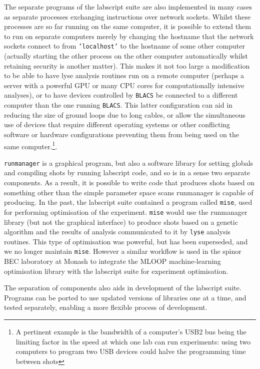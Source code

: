 The separate programs of the labscript suite are also implemented in many cases as separate processes exchanging instructions over network sockets. Whilst these processes are so far running on the same computer, it is possible to extend them to run on separate computers merely by changing the hostname that the network sockets connect to from \texttt{'localhost'} to the hostname of some other computer (actually starting the other process on the other computer automatically whilst retaining security is another matter). This makes it not too large a modification to be able to have lyse analysis routines run on a remote computer (perhaps a server with a powerful GPU or many CPU cores for computationally intensive analyses), or to have devices controlled by \texttt{BLACS} be connected to a different computer than the one running \texttt{BLACS}. This latter configuration can aid in reducing the size of ground loops due to long cables, or allow the simultaneous use of devices that require different operating systems or other conflicting software or hardware configurations preventing them from being used on the same computer.\footnote{A pertinent example is the bandwidth of a computer's USB2 bus being the limiting factor in the speed at which one lab can run experiments: using two computers to program two USB devices could halve the programming time between shots}.

\texttt{runmanager} is a graphical program, but also a software library for setting globals and compiling shots by running labscript code, and so is in a sense two separate components. As a result, it is possible to write code that produces shots based on something other than the simple parameter space scans runmanager is capable of producing. In the past, the labscript suite contained a program called \texttt{mise}, used for performing optimisation of the experiment. \texttt{mise} would use the runmanager library (but not the graphical interface) to produce shots based on a genetic algorithm and the results of analysis communicated to it by \texttt{lyse} analysis routines. This type of optimisation was powerful, but has been superseded, and we no longer maintain \texttt{mise}. However a similar workflow is used in the spinor BEC laboratory at Monash to integrate the MLOOP machine-learning optimisation library with the labscript suite for experiment optimisation.

The separation of components also aids in development of the labscript suite. Programs can be ported to use updated versions of libraries one at a time, and tested separately, enabling a more flexible process of development.


